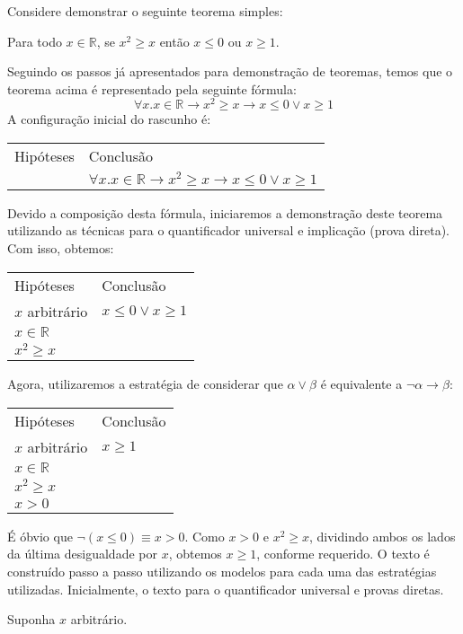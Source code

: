 \begin{Example}
Considere demonstrar o seguinte teorema simples:
\begin{flushleft}
  Para todo $x\in\mathbb{R}$, se $x^2 \geq x$ então $x \leq 0$ ou
  $x\geq 1$.
\end{flushleft}
Seguindo os passos já apresentados para demonstração de teoremas,
temos que o teorema acima é representado pela seguinte fórmula:
\[
\forall x. x \in \mathbb{R} \to x^2 \geq x \to x \leq 0 \lor x \geq 1
\]
A configuração inicial do rascunho é:
\begin{flushleft}
\begin{tabular}{ll}
Hipóteses & Conclusão \\
 & $\forall x. x \in \mathbb{R} \to x^2 \geq x \to x \leq 0 \lor x \geq 1$
\end{tabular}
\end{flushleft}
Devido a composição desta fórmula, iniciaremos a demonstração deste
teorema utilizando as técnicas para o quantificador universal e
implicação (prova direta). Com isso, obtemos:
\begin{flushleft}
\begin{tabular}{ll}
Hipóteses & Conclusão \\
 $x$ arbitrário &  $x \leq 0 \lor x \geq 1$\\
$x \in \mathbb{R} $ & \\
$x^2 \geq x$ &
\end{tabular}
\end{flushleft}
Agora, utilizaremos a estratégia de considerar que $\alpha\lor\beta$ é
equivalente a $\neg \alpha \to \beta$:
\begin{flushleft}
\begin{tabular}{ll}
Hipóteses & Conclusão \\
 $x$ arbitrário & $x \geq 1$\\
$x \in \mathbb{R} $ & \\
$x^2 \geq x$ &\\
$x > 0$
\end{tabular}
\end{flushleft}
É óbvio que $\neg (x\leq 0)\equiv x > 0$. Como $x > 0$ e $x^2 \geq x$,
dividindo ambos os lados da última desigualdade por $x$, obtemos
$x\geq 1$, conforme requerido. O texto é construído passo a passo
utilizando os modelos para cada uma das estratégias
utilizadas. Inicialmente, o texto para o quantificador universal e
provas diretas.
\begin{flushleft}
Suponha $x$ arbitrário.\\

\end{flushleft}
\end{Example}
